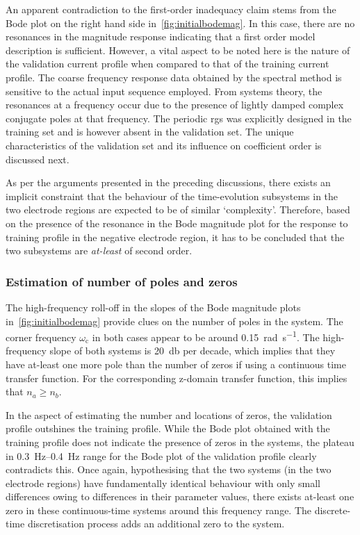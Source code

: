 An apparent  contradiction to  the first-order inadequacy  claim stems  from the
Bode plot  on the  right hand side  in~\cref{fig:initialbodemag}. In  this case,
there are no resonances in the  magnitude response indicating that a first order
model description is sufficient. However, a vital aspect to be noted here is the
nature of the  validation current profile when compared to  that of the training
current profile.  The coarse  frequency response data  obtained by  the spectral
method is sensitive to the actual  input sequence employed. From systems theory,
the  resonances at  a frequency  occur  due to  the presence  of lightly  damped
complex conjugate poles at that frequency. The periodic \gls{rgs} was explicitly
designed in the  training set and is  however absent in the  validation set. The
unique characteristics  of the validation  set and its influence  on coefficient
order is discussed next.

As per  the arguments presented  in the  preceding discussions, there  exists an
implicit constraint that  the behaviour of the time-evolution  subsystems in the
two electrode  regions are  expected to be  of similar  `complexity'. Therefore,
based  on the  presence of  the resonance  in the  Bode magnitude  plot for  the
response to  training profile  in the  negative electrode region,  it has  to be
concluded that the two subsystems are \emph{at-least} of second order.

\subsubsection*{Estimation of number of poles and zeros}

The  high-frequency  roll-off  in  the   slopes  of  the  Bode  magnitude  plots
in~\cref{fig:initialbodemag} provide clues on the number of poles in the system.
The  corner  frequency $\omega_\text{c}$  in  both  cases  appear to  be  around
\SI{0.15}{\radian\per\second}.  The  high-frequency  slope of  both  systems  is
\approx\SI{20}{\decibel} per decade,  which implies that they  have at-least one
more pole than the number of zeros if using a continuous time transfer function.
For the  corresponding z-domain  transfer function, this  implies that  $n_a \ge
n_b$.

In the  aspect of estimating the  number and locations of  zeros, the validation
profile outshines  the training profile. While  the Bode plot obtained  with the
training profile  does not indicate  the presence of  zeros in the  systems, the
plateau in \SIrange{0.3}{0.4}{\hertz} range for  the Bode plot of the validation
profile clearly contradicts this. Once again, hypothesising that the two systems
(in the two electrode regions)  have fundamentally identical behaviour with only
small differences owing  to differences in their parameter  values, there exists
at-least one zero in these  continuous-time systems around this frequency range.
The discrete-time discretisation process adds an additional zero to the system.

